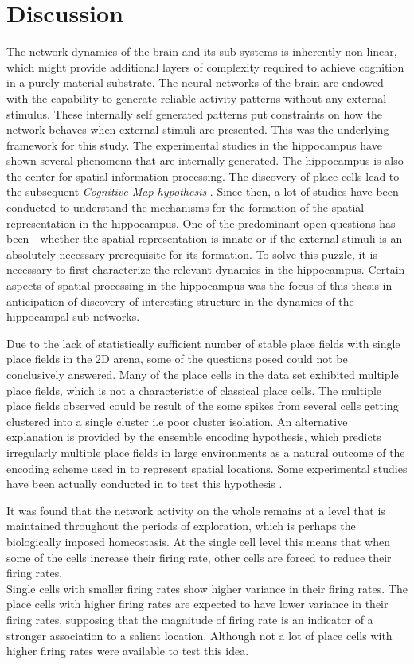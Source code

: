 \chapter{Discussion}

The network dynamics of the brain and its sub-systems is inherently non-linear, which might provide additional layers of complexity required to achieve cognition in a purely material substrate. The neural networks of the brain are endowed with the capability to generate reliable activity patterns without any external stimulus. These internally self generated patterns put constraints on how the network behaves when external stimuli are presented. This was the underlying framework for this study. The experimental studies in the hippocampus have shown several phenomena that are internally generated. The hippocampus is also the center for spatial information processing. The discovery of place cells \cite{O'Keefe1971a} lead to the subsequent \emph{Cognitive Map hypothesis} \cite{Street}. Since then, a lot of studies have been conducted to understand the mechanisms for the formation of the spatial representation in the hippocampus. One of the predominant open questions has been - whether the spatial representation is innate or if the external stimuli is an absolutely necessary prerequisite for its formation. To solve this puzzle, it is necessary to first characterize the relevant dynamics in the hippocampus. Certain aspects of spatial processing in the hippocampus was the focus of this thesis in anticipation of discovery of interesting structure in the dynamics of the hippocampal sub-networks. 

Due to the lack of statistically sufficient number of stable place fields with single place fields in the 2D arena, some of the questions posed could not be conclusively answered. Many of the place cells in the data set exhibited multiple place fields, which is not a characteristic of classical place cells. The multiple place fields observed could be result of the some spikes from several cells getting clustered into a single cluster i.e poor cluster isolation. An alternative explanation is provided by the ensemble encoding hypothesis, which predicts irregularly multiple place fields in large environments as a natural outcome of the encoding scheme used in to represent spatial locations. Some experimental studies have been actually conducted in to test this hypothesis \cite{Fenton2008}. 

It was found that the network activity on the whole remains at a level that is maintained throughout the periods of exploration, which is perhaps the biologically imposed homeostasis. At the single cell level this means that when some of the cells increase their firing rate, other cells are forced to reduce their firing rates. \\
Single cells with smaller firing rates show higher variance in their firing rates. The place cells with higher firing rates are expected to have lower variance in their firing rates, supposing that the magnitude of firing rate is an indicator of a stronger association to a salient location. Although not a lot of place cells with higher firing rates were available to test this idea.\\

